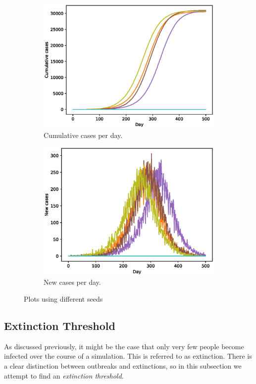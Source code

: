 \documentclass[runningheads]{llncs}
\begin{document}
\begin{figure}[h!]
	\centering
	\begin{subfigure}[b]{0.7\linewidth}
		\includegraphics[width=\linewidth]{cases_cum.eps}
		\caption{Cumulative cases per day.}
	\end{subfigure}
	\begin{subfigure}[b]{0.7\linewidth}
		\includegraphics[width=\linewidth]{cases_per_day.eps}
		\caption{New cases per day.}
	\end{subfigure}
	\caption{Plots using different seeds}
	\label{casesPlots}
\end{figure}


\subsection{Extinction Threshold}
As discussed previously, it might be the case that only very few people become infected over the course of a simulation. This is referred to as extinction. There is a clear distinction between outbreaks and extinctions, so in this subsection we attempt to find an \emph{extinction threshold}.
\end{document}
